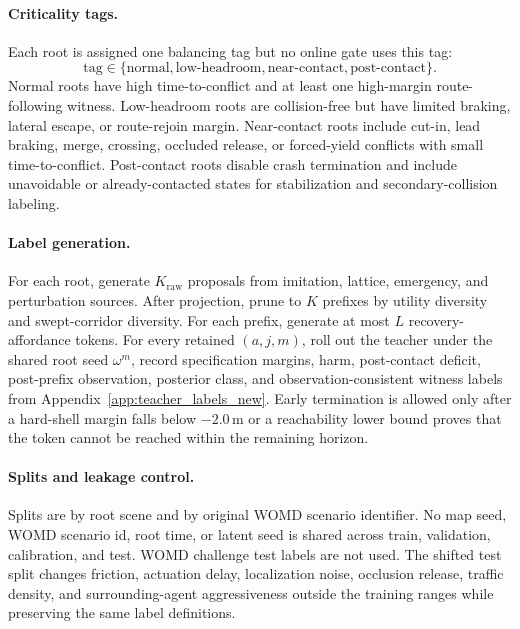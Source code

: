 \documentclass[conference]{IEEEtran}
\begin{document}
\paragraph{Criticality tags.}
Each root is assigned one balancing tag but no online gate uses this tag:
\begin{equation}
\label{eq:app_tags_new}
    \mathrm{tag}\in\{\mathrm{normal},\mathrm{low\text{-}headroom},\mathrm{near\text{-}contact},\mathrm{post\text{-}contact}\}.
\end{equation}
Normal roots have high time-to-conflict and at least one high-margin route-following witness.  Low-headroom roots are collision-free but have limited braking, lateral escape, or route-rejoin margin.  Near-contact roots include cut-in, lead braking, merge, crossing, occluded release, or forced-yield conflicts with small time-to-conflict.  Post-contact roots disable crash termination and include unavoidable or already-contacted states for stabilization and secondary-collision labeling.

\paragraph{Label generation.}
For each root, generate $K_{\mathrm{raw}}$ proposals from imitation, lattice, emergency, and perturbation sources.  After projection, prune to $K$ prefixes by utility diversity and swept-corridor diversity.  For each prefix, generate at most $L$ recovery-affordance tokens.  For every retained $(a,j,m)$, roll out the teacher under the shared root seed $\omega^m$, record specification margins, harm, post-contact deficit, post-prefix observation, posterior class, and observation-consistent witness labels from Appendix~\ref{app:teacher_labels_new}.  Early termination is allowed only after a hard-shell margin falls below $-2.0\,\mathrm{m}$ or a reachability lower bound proves that the token cannot be reached within the remaining horizon.

\paragraph{Splits and leakage control.}
Splits are by root scene and by original WOMD scenario identifier.  No map seed, WOMD scenario id, root time, or latent seed is shared across train, validation, calibration, and test.  WOMD challenge test labels are not used.  The shifted test split changes friction, actuation delay, localization noise, occlusion release, traffic density, and surrounding-agent aggressiveness outside the training ranges while preserving the same label definitions.
\end{document}
